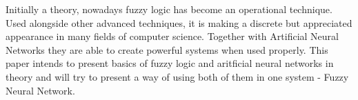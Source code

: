 Initially a theory, nowadays fuzzy logic has become an operational technique.
Used alongside other advanced techniques, it is making a discrete but appreciated appearance in many fields of computer science.
Together with Artificial Neural Networks they are able to create powerful systems when used properly.
This paper intends to present basics of fuzzy logic and aritficial neural networks in theory and will try to present a way of using both of them in one system - Fuzzy Neural Network.